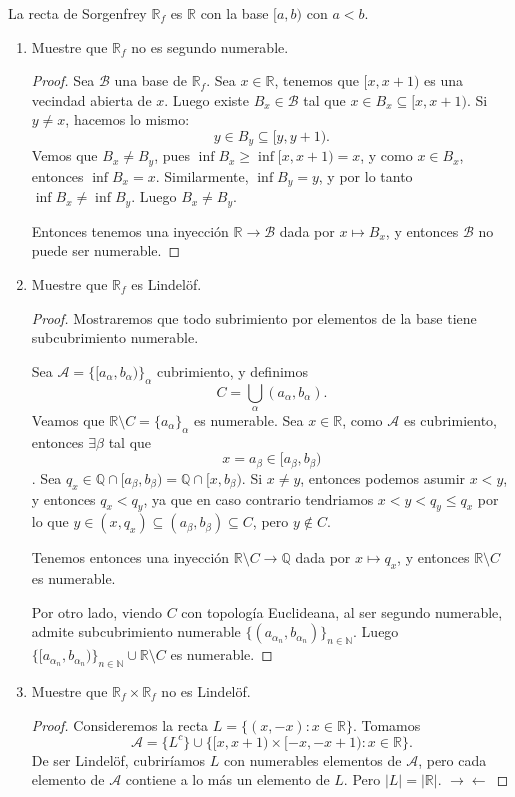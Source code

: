 \documentclass{article}
\theoremstyle{definition}
\theoremstyle{remark}
\numberwithin{equation}{section}
\newcommand{\B}{\mathcal{B}}
\newcommand{\N}{\mathbb{N}}
\newcommand{\Q}{\mathbb{Q}}
\newcommand{\R}{\mathbb{R}}
\newcommand{\Acal}{\mathcal{A}}
\renewcommand{\a}{\alpha}
\renewcommand{\b}{\beta}
\newcommand{\abs}[1]{\left| #1 \right|}
\begin{document}
La recta de Sorgenfrey $\R_f$ es $\R$ con la base $[a,b)$ con $a<b$.
\begin{enumerate}
  \item Muestre que $\R_f$ no es segundo numerable.
  \begin{proof}
    Sea $\B$ una base de $\R_f$. Sea $x \in \R$, tenemos que $[x,x+1)$ es una vecindad abierta de $x$.
    Luego existe $B_x \in \B$ tal que $x \in B_x \subseteq [x,x+1)$.
    Si $y \neq x$, hacemos lo mismo:
    \[y \in B_y \subseteq [y,y+1).\]
    Vemos que $B_x \neq B_y$, pues $\inf{B_x} \geq \inf{[x,x+1)} = x$, y como $x \in B_x$, entonces $\inf{B_x} = x$. Similarmente, $\inf{B_y} = y$, y por lo tanto $\inf{B_x} \neq \inf{B_y}$. Luego $B_x \neq B_y$.

    Entonces tenemos una inyección $\R \to \B$ dada por $x \mapsto B_x$, y entonces $\B$ no puede ser numerable.
  \end{proof}

  \item Muestre que $\R_f$ es Lindelöf.
  \begin{proof}
    Mostraremos que todo subrimiento por elementos de la base tiene subcubrimiento numerable.

    Sea $\Acal = \{[a_\a,b_\a)\}_\a$ cubrimiento, y definimos
    \[C = \bigcup_\a (a_\a,b_\a).\]
    Veamos que $\R \setminus C = \{a_\a\}_\a$ es numerable. Sea $x \in \R$, como $\Acal$ es cubrimiento, entonces $\exists \b$ tal que $$x = a_\b \in [a_\b,b_\b)$$.
    Sea $q_x \in \Q \cap [a_\b,b_\b) = \Q \cap [x,b_\b)$. Si $x \neq y$, entonces podemos asumir $x < y$, y entonces $q_x < q_y$, ya que en caso contrario tendriamos $x < y < q_y \leq q_x$ por lo que $y \in (x,q_x) \subseteq (a_\b,b_\b) \subseteq C$, pero $y \notin C$.

    Tenemos entonces una inyección $\R \setminus C \to \Q$ dada por $x \mapsto q_x$, y entonces $\R \setminus C$ es numerable.

    Por otro lado, viendo $C$ con topología Euclideana, al ser segundo numerable, admite subcubrimiento numerable $\{(a_{\a_n},b_{\a_n})\}_{n\in\N}$. Luego $\{[a_{\a_n},b_{\a_n})\}_{n\in\N} \cup \R\setminus C$ es numerable.
  \end{proof}

  \item Muestre que $\R_f \times \R_f$ no es Lindelöf.
  \begin{proof}
    Consideremos la recta $L = \{(x,-x) \colon x \in \R\}$. Tomamos
    \[\Acal = \{L^c\} \cup \{[x,x+1) \times [-x,-x+1) \colon x \in \R\}.\]
    De ser Lindelöf, cubriríamos $L$ con numerables elementos de $\Acal$, pero cada elemento de $\Acal$ contiene a lo más un elemento de $L$. Pero $\abs L = \abs \R$. $\to\gets$
  \end{proof}
\end{enumerate}
\end{document}
